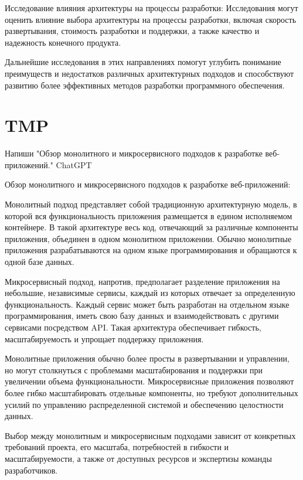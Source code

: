     Исследование влияния архитектуры на процессы разработки: Исследования могут оценить влияние выбора архитектуры на процессы разработки, включая скорость развертывания, стоимость разработки и поддержки, а также качество и надежность конечного продукта.

Дальнейшие исследования в этих направлениях помогут углубить понимание преимуществ и недостатков различных архитектурных подходов и способствуют развитию более эффективных методов разработки программного обеспечения.








\section{TMP}



Напиши "Обзор монолитного и микросервисного подходов к разработке веб-приложений."
ChatGPT

Обзор монолитного и микросервисного подходов к разработке веб-приложений:

Монолитный подход представляет собой традиционную архитектурную модель, в которой вся функциональность приложения размещается в едином исполняемом контейнере. В такой архитектуре весь код, отвечающий за различные компоненты приложения, объединен в одном монолитном приложении. Обычно монолитные приложения разрабатываются на одном языке программирования и обращаются к одной базе данных.

Микросервисный подход, напротив, предполагает разделение приложения на небольшие, независимые сервисы, каждый из которых отвечает за определенную функциональность. Каждый сервис может быть разработан на отдельном языке программирования, иметь свою базу данных и взаимодействовать с другими сервисами посредством API. Такая архитектура обеспечивает гибкость, масштабируемость и упрощает поддержку приложения.

Монолитные приложения обычно более просты в развертывании и управлении, но могут столкнуться с проблемами масштабирования и поддержки при увеличении объема функциональности. Микросервисные приложения позволяют более гибко масштабировать отдельные компоненты, но требуют дополнительных усилий по управлению распределенной системой и обеспечению целостности данных.

Выбор между монолитным и микросервисным подходами зависит от конкретных требований проекта, его масштаба, потребностей в гибкости и масштабируемости, а также от доступных ресурсов и экспертизы команды разработчиков.




